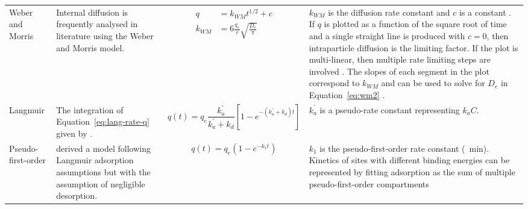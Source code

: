\begin{landscape}
\begin{footnotesize}
\begin{longtable}{>{\raggedright\arraybackslash}p{2cm}p{6cm}p{6cm}p{7.25cm}}
			Weber and Morris
			
			& Internal diffusion is frequently analysed in literature using the Weber and Morris model.
			
			& 
			{\begin{align}
			q & = k_{WM} t^{1/2} + c \label{eq:wm1} \\
			k_{WM} & = 6 \frac{q_e}{r}\sqrt{\frac{D_e}{\pi}} \label{eq:wm2}
			\end{align}}
			
			& $ k_{WM} $ is the diffusion rate constant and $ c $ is a constant \parencite{Largitte2016}. If $ q $ is plotted as a function of the square root of time and a single straight line is produced with $ c = 0 $, then intraparticle diffusion is the limiting factor. If the plot is multi-linear, then multiple rate limiting steps are involved \parencite{Fierro2008}. The slopes of each segment in the plot correspond to $ k_{WM} $ and can be used to solve for $ D_e $ in Equation~\ref{eq:wm2} \parencite{Tsibranska2011}.  \\
			
			
			Langmuir
			
			& The integration of Equation~\ref{eq:lang-rate-q} given by \textcite{Largitte2016}.   
			
			& \begin{equation}
			q\left(t\right) = q_e \frac{k^\prime_a}{k^\prime_a + k_d} \left[ 1 - e^{-\left(k^\prime_a + k_d\right)t} \right] \label{eq:psuedo-lang}
			\end{equation}
			
			& $ k^\prime_a $ is a pseudo-rate constant representing $ k_aC $.	\\
			
			Pseudo-first-order
			
			& \textcite{Lagergren1898} derived a model following Langmuir adsorption assumptions \parencite{Largitte2016,Ho2000} but with the assumption of negligible desorption. 
			
			& \begin{equation}
			q\left(t\right) = q_e \left( 1 - e^{-k_1t} \right) \label{eq:pfo}
			\end{equation}
			
			& $ k_1 $ is the pseudo-first-order rate constant  (\si{\per\minute}). Kinetics of sites with different binding energies can be represented by fitting adsorption as the sum of multiple pseudo-first-order compartments \parencite{Cornelissen1997} \\
			

\end{longtable}
\end{footnotesize}
\end{landscape}
